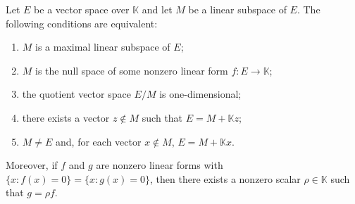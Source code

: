 Let $E$ be a vector space over $\mathbb{K}$ and let $M$ be a linear subspace of $E$. The following conditions are equivalent:
\begin{enumerate}
\item[(a)] $M$ is a maximal linear subspace of $E$;
\item[(b)] $M$ is the null space of some nonzero linear form $f: E \to \mathbb{K}$;
\item[(c)] the quotient vector space $E/M$ is one-dimensional;
\item[(d)] there exists a vector $z \notin M$ such that $E = M + \mathbb{K}z$;
\item[(e)] $M \neq E$ and, for each vector $x \notin M$, $E = M + \mathbb{K}x$.
\end{enumerate}
Moreover, if $f$ and $g$ are nonzero linear forms with $\{x : f(x) = 0\} = \{x : g(x) = 0\}$, then there exists a nonzero scalar $\rho \in \mathbb{K}$ such that $g = \rho f$.
